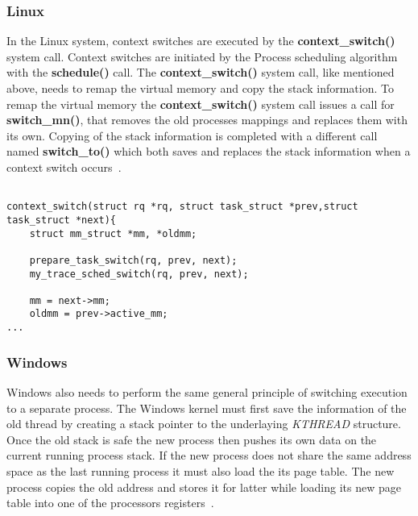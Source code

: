 \documentclass[letterpaper,10pt,notitlepage,fleqn]{article}
\begin{document}
\subsubsection*{Linux} 
In the Linux system, context switches are executed by the \textbf{context\_switch()} 
system call. Context switches are initiated by the Process scheduling algorithm 
with the \textbf{schedule()} call. The \textbf{context\_switch()} system call, 
like mentioned above, needs to remap the virtual memory and copy the stack information. 
To remap the virtual memory the \textbf{context\_switch()} system call issues a 
call for \textbf{switch\_mn()}, that removes the old processes mappings and replaces 
them with its own. Copying of the stack information is completed with a different 
call named \textbf{switch\_to()} which both saves and replaces the stack information 
when a context switch occurs~\cite{LKD3}. 
\begin{lstlisting}
    
context_switch(struct rq *rq, struct task_struct *prev,struct task_struct *next){
    struct mm_struct *mm, *oldmm;
    
    prepare_task_switch(rq, prev, next);
    my_trace_sched_switch(rq, prev, next);
    
    mm = next->mm;
    oldmm = prev->active_mm;
...
\end{lstlisting}

\subsubsection*{Windows}
Windows also needs to perform the same general principle of switching execution 
to a separate process. The Windows kernel must first save the information of the 
old thread by creating a stack pointer to the underlaying \textit{KTHREAD} structure. 
Once the old stack is safe the new process then pushes its own data on the current 
running process stack. If the new process does not share the same address space as 
the last running process it must also load the its page table. The new  process
copies the old address and stores it for latter while loading its new page table 
into one of the processors registers~\cite{WI16}.
\end{document}
